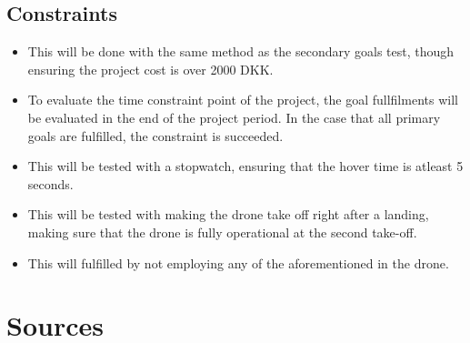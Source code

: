 \documentclass{article}
\begin{document}
\subsection{Constraints}
\begin{itemize}
    \item
    This will be done with the same method as the secondary goals test, though ensuring the project cost is over 2000 DKK. 
    \item
    To evaluate the time constraint point of the project, the goal fullfilments will be evaluated in the end of the project period. In the case that all primary goals are fulfilled, the constraint is succeeded.  
    \item
    This will be tested with a stopwatch, ensuring that the hover time is atleast 5 seconds. 
    \item
    This will be tested with making the drone take off right after a landing, making sure that the drone is fully operational at the second take-off. 
    \item
    This will \cite{Euasa} fulfilled by not employing any of the aforementioned in the drone. 
\end{itemize}

\section{Sources}



\end{document}
